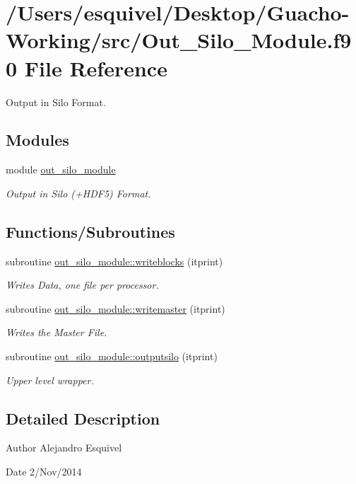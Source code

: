 \hypertarget{_out___silo___module_8f90}{}\section{/\+Users/esquivel/\+Desktop/\+Guacho-\/\+Working/src/\+Out\+\_\+\+Silo\+\_\+\+Module.f90 File Reference}
\label{_out___silo___module_8f90}


Output in Silo Format.  


\subsection*{Modules}
\begin{DoxyCompactItemize}
\item 
module \hyperlink{namespaceout__silo__module}{out\+\_\+silo\+\_\+module}
\begin{DoxyCompactList}\small\item\em Output in Silo (+\+H\+D\+F5) Format. \end{DoxyCompactList}\end{DoxyCompactItemize}
\subsection*{Functions/\+Subroutines}
\begin{DoxyCompactItemize}
\item 
subroutine \hyperlink{namespaceout__silo__module_acfa5a749647a6a7c95e48e3ad58e4139}{out\+\_\+silo\+\_\+module\+::writeblocks} (itprint)
\begin{DoxyCompactList}\small\item\em Writes Data, one file per processor. \end{DoxyCompactList}\item 
subroutine \hyperlink{namespaceout__silo__module_aa984d6044bf34559a87a9020c4a07c3a}{out\+\_\+silo\+\_\+module\+::writemaster} (itprint)
\begin{DoxyCompactList}\small\item\em Writes the Master File. \end{DoxyCompactList}\item 
subroutine \hyperlink{namespaceout__silo__module_a65763f848b9b5da2a20d8b55f53f8515}{out\+\_\+silo\+\_\+module\+::outputsilo} (itprint)
\begin{DoxyCompactList}\small\item\em Upper level wrapper. \end{DoxyCompactList}\end{DoxyCompactItemize}


\subsection{Detailed Description}
\begin{DoxyAuthor}{Author}
Alejandro Esquivel 
\end{DoxyAuthor}
\begin{DoxyDate}{Date}
2/\+Nov/2014 
\end{DoxyDate}
